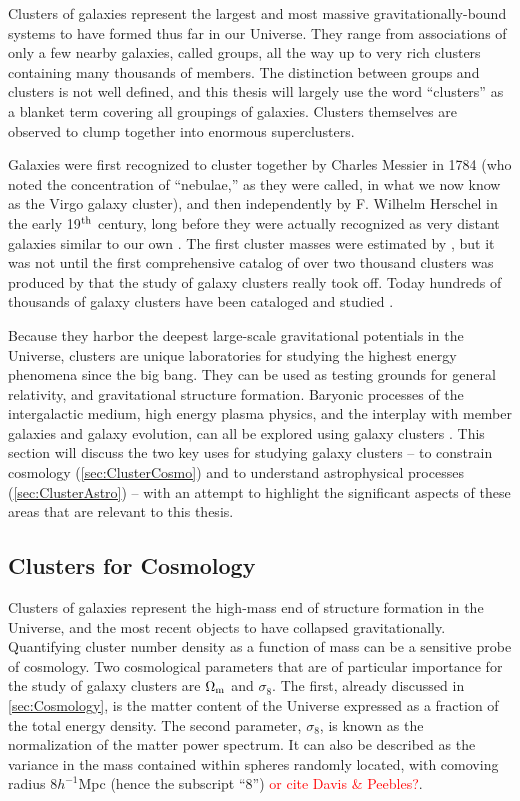 Clusters of galaxies represent the largest and most massive gravitationally-bound systems to have formed thus far in our Universe. They range from associations of only a few nearby galaxies, called groups, all the way up to very rich clusters containing many thousands of members. The distinction between groups and clusters is not well defined, and this thesis will largely use the word ``clusters'' as a blanket term covering all groupings of galaxies. Clusters themselves are observed to clump together into enormous superclusters.

Galaxies were first recognized to cluster together by Charles Messier in 1784 (who noted the concentration of ``nebulae,'' as they were called, in what we now know as the Virgo galaxy cluster), and then independently by F. Wilhelm Herschel in the early 19$^{\rm th}$ century, long before they were actually recognized as very distant galaxies similar to our own \citep{Biviano00}. The first cluster masses were estimated by \citet{Zwicky33}, but it was not until the first comprehensive catalog of over two thousand clusters was produced by \citet{Abell58} that the study of galaxy clusters really took off. Today hundreds of thousands of galaxy clusters have been cataloged and studied \citep[see e.g.][]{Wen12}.

Because they harbor the deepest large-scale gravitational potentials in the Universe, clusters are unique laboratories for studying the highest energy phenomena since the big bang. They can be used as testing grounds for general relativity, and gravitational structure formation. Baryonic processes of the intergalactic medium, high energy plasma physics, and the interplay with member galaxies and galaxy evolution, can all be explored using galaxy clusters \citep{Kravtsov12}. This section will discuss the two key uses for studying galaxy clusters -- to constrain cosmology (\autoref{sec:ClusterCosmo}) and to understand astrophysical processes (\autoref{sec:ClusterAstro}) -- with an attempt to highlight the significant aspects of these areas that are relevant to this thesis.

\subsection{Clusters for Cosmology}
\label{sec:ClusterCosmo}
Clusters of galaxies represent the high-mass end of structure formation in the Universe, and the most recent objects to have collapsed gravitationally. Quantifying cluster number density as a function of mass can be a sensitive probe of cosmology. Two cosmological parameters that are of particular importance for the study of galaxy clusters are $\Omega_{\rm m}$ and $\sigma_8$. The first, already discussed in \autoref{sec:Cosmology}, is the matter content of the Universe expressed as a fraction of the total energy density. The second parameter, $\sigma_8$, is known as the normalization of the matter power spectrum. It can also be described as the variance in the mass contained within spheres randomly located, with comoving radius $8 h^{-1}$Mpc (hence the subscript ``8'') \citep{Voit05} \textcolor{red}{or cite Davis \& Peebles?}.

